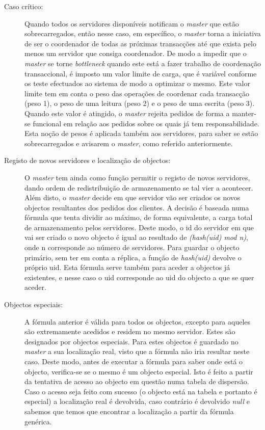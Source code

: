 \begin{description}
\item[Caso crítico:]
Quando todos os servidores disponíveis notificam o \textit{master} que estão sobrecarregados, então nesse caso, em específico, o \textit{master} torna a iniciativa de ser o coordenador de todas as próximas transacções até que exista pelo menos um servidor que consiga coordenador. De modo a impedir que o \textit{master} se torne \textit{bottleneck} quando este está a fazer trabalho de coordenação transaccional, é imposto um valor limite de carga, que é variável conforme os teste efectuados ao sistema de modo a optimizar o mesmo. Este valor limite tem em conta o peso das operações de coordenar cada transacção (peso 1), o peso de uma leitura (peso 2) e o peso de uma escrita (peso 3). Quando este valor é atingido, o \textit{master} rejeita pedidos de forma a manter-se funcional em relação aos pedidos sobre os quais já tem responsabilidade. Esta noção de pesos é aplicada também aos servidores, para saber se estão sobrecarregados e avisarem o \textit{master}, como referido anteriormente.

\item[Registo de novos servidores e localização de objectos:]
O \textit{master} tem ainda como função permitir o registo de novos servidores, dando ordem de redistribuição de armazenamento se tal vier a acontecer. Além disto, o \textit{master} decide em que servidor vão ser criados os novos objectos resultantes dos pedidos dos clientes. A decisão é baseada numa fórmula que tenta dividir ao máximo, de forma equivalente, a carga total de armazenamento pelos servidores. Deste modo, o id do servidor em que vai ser criado o novo objecto é igual ao resultado de \textit{(hash(uid) mod n)}, onde n corresponde ao número de servidores. Para guardar o objecto primário, sem ter em conta a réplica, a função de \textit{hash(uid)} devolve o próprio uid. Esta fórmula serve também para aceder a objectos já existentes, e nesse caso o uid corresponde ao uid do objecto a que se quer aceder.

\item[Objectos especiais:]
A fórmula anterior é válida para todos os objectos, excepto para aqueles são extremamente acedidos e residem no mesmo servidor. Estes são designados por objectos especiais. Para estes objectos é guardado no \textit{master} a sua localização real, visto que a fórmula não iria resultar neste caso. Deste modo, antes de executar a fórmula para saber onde está o objecto, verifica-se se o mesmo é um objecto especial. Isto é feito a partir da tentativa de acesso ao objecto em questão numa tabela de dispersão. Caso o acesso seja feito com sucesso (o objecto está na tabela e portanto é especial) a localização real é devolvida, caso contrário é devolvido \textit{null} e sabemos que temos que encontrar a localização a partir da fórmula genérica.


\end{description}
